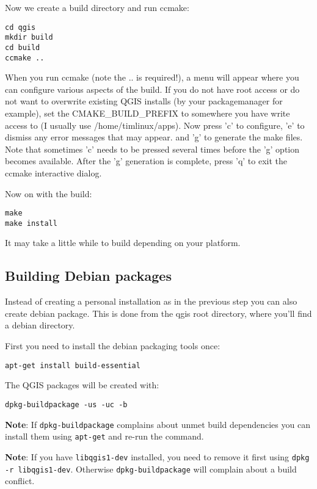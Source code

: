 Now we create a build directory and run ccmake:

\begin{verbatim}
cd qgis
mkdir build
cd build
ccmake ..
\end{verbatim}

When you run ccmake (note the .. is required!), a menu will appear where 
you can configure various aspects of the build. If you do not have root
access or do not want to overwrite existing QGIS installs (by your
packagemanager for example), set the CMAKE\_BUILD\_PREFIX to somewhere you
have write access to (I usually use /home/timlinux/apps). Now press
'c' to configure, 'e' to dismiss any error messages that may appear.
and 'g' to generate the make files. Note that sometimes 'c' needs to 
be pressed several times before the 'g' option becomes available.
After the 'g' generation is complete, press 'q' to exit the ccmake 
interactive dialog.

Now on with the build:

\begin{verbatim}
make
make install
\end{verbatim}

It may take a little while to build depending on your platform.

\subsection{Building Debian packages}
Instead of creating a personal installation as in the previous step you can
also create debian package.  This is done from the qgis root directory, where
you'll find a debian directory.

First you need to install the debian packaging tools once:

\begin{verbatim}
apt-get install build-essential
\end{verbatim}

The QGIS packages will be created with:

\begin{verbatim}
dpkg-buildpackage -us -uc -b
\end{verbatim}

\textbf{Note}: If \texttt{dpkg-buildpackage} complains about unmet build dependencies
you can install them using \texttt{apt-get} and re-run the command.

\textbf{Note}: If you have \texttt{libqgis1-dev} installed, you need to remove it first
using \texttt{dpkg -r libqgis1-dev}.  Otherwise \texttt{dpkg-buildpackage} will complain about a
build conflict.

